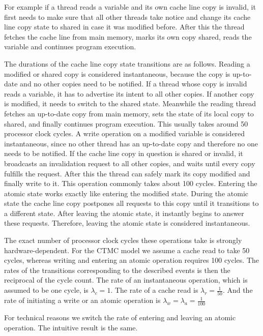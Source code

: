 \documentclass[a4paper, 10pt]{article}
\begin{document}
For example if a thread reads a variable and its own cache line copy is invalid, it first needs to make sure that all other threads take notice and change its cache line copy state to shared in case it was modified before. After this the thread fetches the cache line from main memory, marks its own copy shared, reads the variable and continues program execution.

The durations of the cache line copy state transitions are as follows.
Reading a modified or shared copy is considered instantaneous, because the copy is up-to-date and no other copies need to be notified.
If a thread whose copy is invalid reads a variable, it has to advertise its intent to all other copies. If another copy is modified, it needs to switch to the shared state. Meanwhile the reading thread fetches an up-to-date copy from main memory, sets the state of its local copy to shared, and finally continues program execution. This usually takes around 50 processor clock cycles.
A write operation on a modified variable is considered instantaneous, since no other thread has an up-to-date copy and therefore no one needs to be notified.
If the cache line copy in question is shared or invalid, it broadcasts an invalidation request to all other copies, and waits until every copy fulfills the request. After this the thread can safely mark its copy modified and finally write to it. This operation commonly takes about 100 cycles.
Entering the atomic state works exactly like entering the modified state.
During the atomic state the cache line copy postpones all requests to this copy until it transitions to a different state. After leaving the atomic state, it instantly begins to answer these requests. Therefore, leaving the atomic state is considered instantaneous.

The exact number of processor clock cycles these operations take is strongly hardware-dependent. For the CTMC model we assume a cache read to take 50 cycles, whereas writing and entering an atomic operation requires 100 cycles. The rates of the transitions corresponding to the described events is then the reciprocal of the cycle count.
The rate of an instantaneous operation, which is assumed to be one cycle, is $\lambda_c = 1$. The rate of a cache read is $\lambda_r = \frac{1}{50}$. And the rate of initiating a write or an atomic operation is $\lambda_w = \lambda_a = \frac{1}{100}$

For technical reasons we switch the rate of entering and leaving an atomic operation. The intuitive result is the same.
\end{document}
